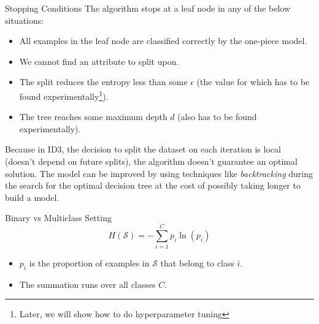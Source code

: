 \documentclass[9pt,dvipsnames]{beamer}
\begin{document}
	\begin{frame}{Stopping Conditions}
		The algorithm stops at a leaf node in any of the below situations:
		\begin{itemize}
			\item All examples in the leaf node are classified correctly by the one-piece model.
			\item We cannot find an attribute to split upon.
			\item The split reduces the entropy less than some $\epsilon$ (the value for which has to be found experimentally\footnote{Later, we will show how to do hyperparameter tuning}).
			\item The tree reaches some maximum depth $d$ (also has to be found experimentally).
		\end{itemize}
		Because in ID3, the decision to split the dataset on each iteration is local (doesn't depend on future splits), the algorithm doesn't guarantee an optimal solution. The model can be improved by using techniques like \textit{backtracking} during the search for the optimal decision tree at the cost of possibly taking longer to build a model.
	\end{frame}
	\begin{frame}{Binary vs Multiclass Setting}
		$$
		H(\mathcal{S})=-\sum_{i=1}^C p_i \ln \left(p_i\right)
		$$
		\begin{itemize}
			\item $p_i$ is the proportion of examples in $\mathcal{S}$ that belong to class $i$.
			\item The summation runs over all classes $C$.
		\end{itemize}
	\end{frame}
	
\end{document}
